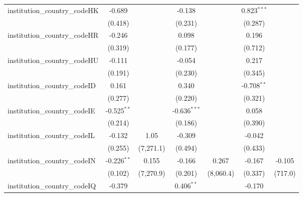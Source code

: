 \begin{tabular}{lcccccc}
   institution\_country\_codeHK          & -0.689         &               & -0.138         &                & 0.823$^{***}$  &   \\   
                                         & (0.418)        &               & (0.231)        &                & (0.287)        &   \\   
   institution\_country\_codeHR          & -0.246         &               & 0.098          &                & 0.196          &   \\   
                                         & (0.319)        &               & (0.177)        &                & (0.712)        &   \\   
   institution\_country\_codeHU          & -0.111         &               & -0.054         &                & 0.217          &   \\   
                                         & (0.191)        &               & (0.230)        &                & (0.345)        &   \\   
   institution\_country\_codeID          & 0.161          &               & 0.340          &                & -0.708$^{**}$  &   \\   
                                         & (0.277)        &               & (0.220)        &                & (0.321)        &   \\   
   institution\_country\_codeIE          & -0.525$^{**}$  &               & -0.636$^{***}$ &                & 0.058          &   \\   
                                         & (0.214)        &               & (0.186)        &                & (0.390)        &   \\   
   institution\_country\_codeIL          & -0.132         & 1.05          & -0.309         &                & -0.042         &   \\   
                                         & (0.255)        & (7,271.1)     & (0.494)        &                & (0.433)        &   \\   
   institution\_country\_codeIN          & -0.226$^{**}$  & 0.155         & -0.166         & 0.267          & -0.167         & -0.105\\   
                                         & (0.102)        & (7,270.9)     & (0.201)        & (8,060.4)      & (0.337)        & (717.0)\\   
   institution\_country\_codeIQ          & -0.379         &               & 0.406$^{**}$   &                & -0.170         &   \\   

\end{tabular}
